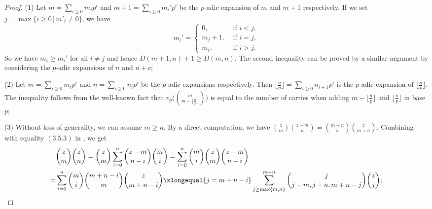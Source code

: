 \documentclass[12pt]{amsart}
\theoremstyle{definition}
\numberwithin{equation}{subsection}
\begin{document}
\begin{proof}
(1) Let $m=\sum\limits_{i\geq 0}m_ip^i$ and $m+1=\sum\limits_{i\geq 0}m_i'p^i$ be the $p$-adic expansion of $m$ and $m+1$ respectively. If we set $j=\max\{i\geq 0\,| \,m'_i\neq 0 \}$, we have 
		$$
		m_i'= 
		\begin{cases}
		0, & \text{~if~}i<j,\\
		m_j+1, & \text{~if~} i=j,\\
		m_i, & \text{~if~} i>j. 
		\end{cases}
		$$
So we have $m_i\geq m_i'$ for all $i\neq j$ and hence $D(m+1,n)+1\geq D(m,n)$. The second inequality can be proved by a similar argument by considering the $p$-adic expansions of $n$ and $n+c$;

(2) Let $m=\sum\limits_{i\geq 0}m_ip^i$ and $n=\sum\limits_{i\geq 0}n_ip^i$ be the $p$-adic expansions respectively. Then $\lfloor \frac np\rfloor=\sum\limits_{i\geq 0}n_{i+1}p^i$ is the $p$-adic expansion of $\lfloor \frac np\rfloor$. The inequality follows from the well-known fact that $v_p\big(\binom{m}{m-\lfloor \frac np \rfloor} \big)$ is equal to the number of carries when adding $m-\lfloor \frac np\rfloor$ and $\lfloor \frac np\rfloor$ in base $p$;

(3) Without loss of generality, we can assume $m\geq n$. By a direct computation, we have $\binom zm \binom{z-m}n=\binom{m+n}n\binom z{m+n}$. Combining with equality $(3.5.3)$ in \cite{liu-wan-xiao}, we get
		\begin{align*}
		&\binom zm\binom zn=\binom zm\sum_{i=0}^n \binom{z-m}{n-i}\binom mi=\sum_{i=0}^n \binom mi \binom zm\binom{z-m}{n-i}\\
		=&\sum_{i=0}^n\binom mi\binom{m+n-i}{m}\binom z{m+n-i}\xlongequal{j=m+n-i}\sum_{j \geq \max\{m,n\}}^{m+n}\binom{j}{j-m,j-n, m+n-j}\binom z{j};
		\end{align*}


\end{proof}
\end{document}
